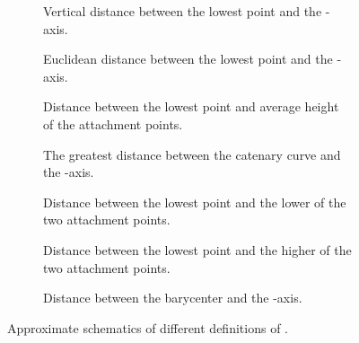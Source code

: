 \begin{figure}
	\centering
	\begin{subfigure}{.48\figurewidth}
		\centering
		
		\caption{Vertical distance between the lowest point and the -axis.}
	\end{subfigure}
	\begin{subfigure}{.48\figurewidth}
		\centering
		
		\caption{Euclidean distance between the lowest point and the -axis.}
	\end{subfigure}
	\begin{subfigure}{.48\figurewidth}
		\centering
		
		\caption{Distance between the lowest point and average height of the attachment points.}
	\end{subfigure}
	\begin{subfigure}{.48\figurewidth}
		\centering
		
		\caption{The greatest distance between the catenary curve and the -axis.}
	\end{subfigure}
	\begin{subfigure}{.48\figurewidth}
		\centering
		
		\caption{Distance between the lowest point and the lower of the two attachment points.}
	\end{subfigure}
	\begin{subfigure}{.48\figurewidth}
		\centering
		
		\caption{Distance between the lowest point and the higher of the two attachment points.}
	\end{subfigure}
	\begin{subfigure}{.48\figurewidth}
		\centering
		
		\caption{Distance between the barycenter and the -axis.}
	\end{subfigure}
	\caption{Approximate schematics of different definitions of .}
	\label{cm_poapd_pbm_dotpd_computation_of_l}
\end{figure}

